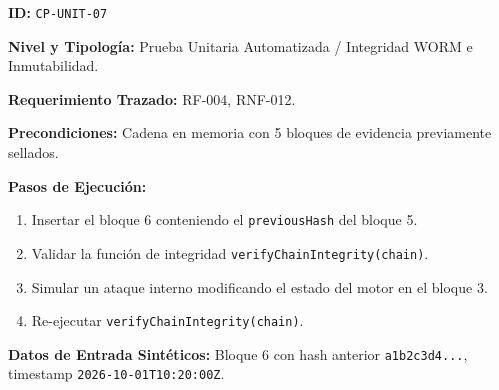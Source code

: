 \par\noindent\textbf{ID:} \texttt{C\allowbreak{}P\allowbreak{}-\allowbreak{}U\allowbreak{}N\allowbreak{}I\allowbreak{}T\allowbreak{}-\allowbreak{}0\allowbreak{}7\allowbreak{}}\par
\par\noindent\textbf{Nivel y Tipología:} Prueba Unitaria Automatizada / Integridad WORM e Inmutabilidad.\par
\par\noindent\textbf{Requerimiento Trazado:} RF-004, RNF-012.\par
\par\noindent\textbf{Precondiciones:} Cadena en memoria con 5 bloques de evidencia previamente sellados.\par
\par\noindent\textbf{Pasos de Ejecución:} \par
\begin{enumerate}
\item Insertar el bloque 6 conteniendo el \texttt{p\allowbreak{}r\allowbreak{}e\allowbreak{}v\allowbreak{}i\allowbreak{}o\allowbreak{}u\allowbreak{}s\allowbreak{}H\allowbreak{}a\allowbreak{}s\allowbreak{}h\allowbreak{}} del bloque 5.
\item Validar la función de integridad \texttt{v\allowbreak{}e\allowbreak{}r\allowbreak{}i\allowbreak{}f\allowbreak{}y\allowbreak{}C\allowbreak{}h\allowbreak{}a\allowbreak{}i\allowbreak{}n\allowbreak{}I\allowbreak{}n\allowbreak{}t\allowbreak{}e\allowbreak{}g\allowbreak{}r\allowbreak{}i\allowbreak{}t\allowbreak{}y\allowbreak{}(\allowbreak{}c\allowbreak{}h\allowbreak{}a\allowbreak{}i\allowbreak{}n\allowbreak{})\allowbreak{}}.
\item Simular un ataque interno modificando el estado del motor en el bloque 3.
\item Re-ejecutar \texttt{v\allowbreak{}e\allowbreak{}r\allowbreak{}i\allowbreak{}f\allowbreak{}y\allowbreak{}C\allowbreak{}h\allowbreak{}a\allowbreak{}i\allowbreak{}n\allowbreak{}I\allowbreak{}n\allowbreak{}t\allowbreak{}e\allowbreak{}g\allowbreak{}r\allowbreak{}i\allowbreak{}t\allowbreak{}y\allowbreak{}(\allowbreak{}c\allowbreak{}h\allowbreak{}a\allowbreak{}i\allowbreak{}n\allowbreak{})\allowbreak{}}.
\end{enumerate}
\par\noindent\textbf{Datos de Entrada Sintéticos:} Bloque 6 con hash anterior \texttt{a\allowbreak{}1\allowbreak{}b\allowbreak{}2\allowbreak{}c\allowbreak{}3\allowbreak{}d\allowbreak{}4\allowbreak{}.\allowbreak{}.\allowbreak{}.\allowbreak{}}, timestamp \texttt{2\allowbreak{}0\allowbreak{}2\allowbreak{}6\allowbreak{}-\allowbreak{}1\allowbreak{}0\allowbreak{}-\allowbreak{}0\allowbreak{}1\allowbreak{}T\allowbreak{}1\allowbreak{}0\allowbreak{}:\allowbreak{}2\allowbreak{}0\allowbreak{}:\allowbreak{}0\allowbreak{}0\allowbreak{}Z\allowbreak{}}.\par
